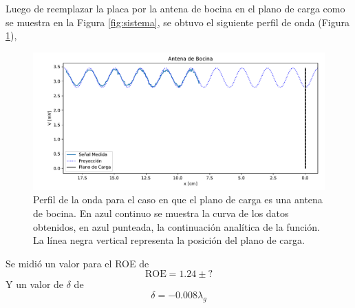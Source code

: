\documentclass[11pt,a4paper]{article}
\begin{document}
\begin{multicols}{2}
Luego de reemplazar la placa por la antena de bocina en el plano de carga como se muestra en la Figura \ref{fig:sistema}, se obtuvo el siguiente perfil de onda (Figura \ref{fig:bocina}),
\begin{figure}[H]
    \centering
    \includegraphics[width=\linewidth]{Images/antena_bocina.pdf}
    \caption{Perfil de la onda para el caso en que el plano de carga es una antena de bocina. En azul continuo se muestra la curva de los datos obtenidos, en azul punteada, la continuación analítica de la función. La línea negra vertical representa la posición del plano de carga.}
    \label{fig:bocina}
\end{figure}
Se midió un valor para el ROE de
$$
\text{ROE} = 1.24\pm?
$$
Y un valor de $\delta$ de
$$
\delta = -0.008\lambda_g
$$

\end{multicols}
\end{document}
